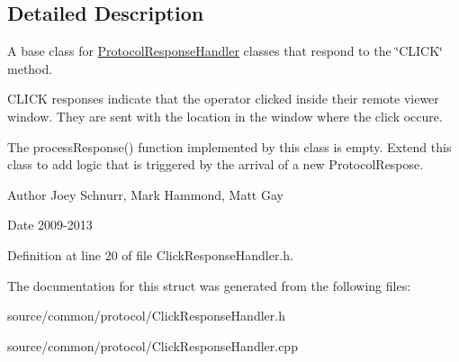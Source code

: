 \subsection{Detailed Description}
A base class for \hyperlink{struct_picto_1_1_protocol_response_handler}{Protocol\-Response\-Handler} classes that respond to the \char`\"{}\-C\-L\-I\-C\-K\char`\"{} method. 

C\-L\-I\-C\-K responses indicate that the operator clicked inside their remote viewer window. They are sent with the location in the window where the click occure.

The process\-Response() function implemented by this class is empty. Extend this class to add logic that is triggered by the arrival of a new Protocol\-Respose. \begin{DoxyAuthor}{Author}
Joey Schnurr, Mark Hammond, Matt Gay 
\end{DoxyAuthor}
\begin{DoxyDate}{Date}
2009-\/2013 
\end{DoxyDate}


Definition at line 20 of file Click\-Response\-Handler.\-h.



The documentation for this struct was generated from the following files\-:\begin{DoxyCompactItemize}
\item 
source/common/protocol/Click\-Response\-Handler.\-h\item 
source/common/protocol/Click\-Response\-Handler.\-cpp\end{DoxyCompactItemize}
